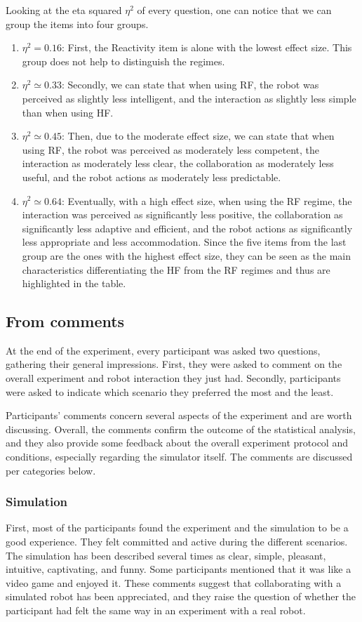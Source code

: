 Looking at the eta squared $\eta^2$ of every question, one can notice that we can group the items into four groups. 
\begin{enumerate}
    \item $\eta^2=0.16$: First, the Reactivity item is alone with the lowest effect size. This group does not help to distinguish the regimes. 
    \item $\eta^2 \simeq 0.33$: Secondly, we can state that when using RF, the robot was perceived as slightly less intelligent, and the interaction as slightly less simple than when using HF. 
    \item $\eta^2 \simeq 0.45$: Then, due to the moderate effect size, we can state that when using RF, the robot was perceived as moderately less competent, the interaction as moderately less clear, the collaboration as moderately less useful, and the robot actions as moderately less predictable. 
    \item $\eta^2 \simeq 0.64$: Eventually, with a high effect size, when using the RF regime, the interaction was perceived as significantly less positive, the collaboration as significantly less adaptive and efficient, and the robot actions as significantly less appropriate and less accommodation. Since the five items from the last group are the ones with the highest effect size, they can be seen as the main characteristics differentiating the HF from the RF regimes and thus are highlighted in the table.
\end{enumerate}

\subsection{From comments}

At the end of the experiment, every participant was asked two questions, gathering their general impressions. First, they were asked to comment on the overall experiment and robot interaction they just had. Secondly, participants were asked to indicate which scenario they preferred the most and the least. 

Participants' comments concern several aspects of the experiment and are worth discussing. Overall, the comments confirm the outcome of the statistical analysis, and they also provide some feedback about the overall experiment protocol and conditions, especially regarding the simulator itself. The comments are discussed per categories below. 

\subsubsection{Simulation}
First, most of the participants found the experiment and the simulation to be a good experience. They felt committed and active during the different scenarios. 
The simulation has been described several times as clear, simple, pleasant, intuitive, captivating, and funny. 
Some participants mentioned that it was like a video game and enjoyed it. 
These comments suggest that collaborating with a simulated robot has been appreciated, and they raise the question of whether the participant had felt the same way in an experiment with a real robot. 

